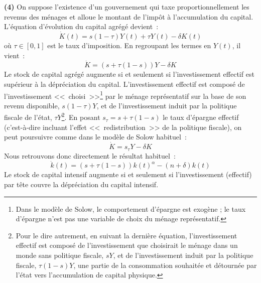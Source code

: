 \documentclass[10pt,a4paper,notitlepage,onecolumn]{article}
\newcommand{\question}[1]{\textbf{(#1)}}
\begin{document}
\question{4} On suppose l'existence d'un gouvernement qui
taxe proportionnellement les revenus des ménages et alloue le
montant de l'impôt à l'accumulation du capital. L'équation
d'évolution du capital agrégé devient~:
\[
  \dot{K}(t) = s(1-\tau) Y(t) + \tau Y(t) - \delta K(t)
\]
où $\tau \in [0,1]$ est le taux d'imposition. En regroupant les
termes en $Y(t)$, il vient~:
\[
  \dot{K} = (s+\tau(1-s)) Y  - \delta K
\]
Le stock de capital agrégé augmente si et seulement si
l'investissement effectif est supérieur à la dépréciation du
capital. L'investissement effectif est composé de l'investissement
<<~choisi~>>\footnote{Dans le modèle de Solow, le comportement
d'épargne est exogène ; le taux d'épargne n'est pas une variable de
choix du ménage représentatif.} par le ménage représentatif sur la
base de son revenu disponible, $s(1-\tau)Y$, et de l'investissement
induit par la politique fiscale de l'état, $\tau Y$\footnote{Pour le
dire autrement, en suivant la dernière équation, l'investissement
effectif est composé de l'investissement que choisirait le ménage
dans un monde sans politique fiscale, $s Y$, et de l'investissement
induit par la politique fiscale, $\tau (1-s) Y$, une partie de la
consommation souhaitée et détournée par l'état vers l'accumulation
de capital physique.}. En posant $s_{\tau} = s+\tau(1-s)$ le taux
d'épargne effectif (c'est-à-dire incluant l'effet <<~redistribution~>>
de la politique fiscale), on peut poursuivre comme dans le modèle de
Solow habituel~:
\[
  \dot{K} = s_{\tau} Y  - \delta K
\]
Nous retrouvons donc directement le résultat habituel~:
\[
  \dot{k}(t) = (s + \tau(1-s)) k(t)^{\alpha} - (n+\delta) k(t)
\]
Le stock de capital intensif augmente si et seulement si
l'investissement (effectif) par tête couvre la dépréciation du
capital intensif.\newline
\end{document}
